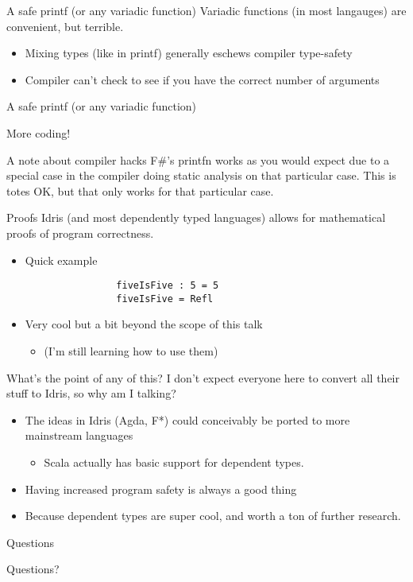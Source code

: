 \documentclass{beamer}
\begin{document}
\begin{frame}{A safe printf (or any variadic function)}
	\transdissolve
	Variadic functions (in most langauges) are convenient, but terrible.
	\begin{itemize}
	  \pause
          \item Mixing types (like in printf) generally eschews compiler type-safety
	  \pause
	  \item Compiler can't check to see if you have the correct number of arguments
	\end{itemize}
\end{frame}
\begin{frame}{A safe printf (or any variadic function)}
	\transdissolve
	\begin{center} 
	  More coding!
	\end{center}
\end{frame}
\begin{frame}{A note about compiler hacks}
 		\transdissolve
  F\#'s printfn works as you would expect due to a special case in the compiler doing static analysis on that particular case. 
  \linebreak
  \linebreak
  \pause
  This is totes OK, but that only works for that particular case.
\end{frame}
\begin{frame}[fragile]{Proofs}
 	\transdissolve
	Idris (and most dependently typed languages) allows for mathematical proofs of program correctness. 
	\begin{itemize}
		\pause
		\item Quick example
			\begin{lstlisting}
				fiveIsFive : 5 = 5
				fiveIsFive = Refl
			\end{lstlisting}

		\pause
		\item Very cool but a bit beyond the scope of this talk \begin{itemize} 
				\pause
				\item (I'm still learning how to use them)
			\end{itemize}
	\end{itemize}
\end{frame}
\begin{frame}{What's the point of any of this? }
 	\transdissolve
	I don't expect everyone here to convert all their stuff to Idris, so why am I talking? 
	\begin{itemize}
		\pause
		\item The ideas in Idris (Agda, F*) could conceivably be ported to more mainstream languages \begin{itemize} 
				\pause
				\item Scala actually has basic support for dependent types.
			\end{itemize}	
		\pause
		\item Having increased program safety is always a good thing
		\pause
		\item Because dependent types are super cool, and worth a ton of further research. 
	\end{itemize}
\end{frame}
\begin{frame}{Questions }
 	\transdissolve
	\begin{center}
		Questions? 
	\end{center}
\end{frame}
\end{document}
